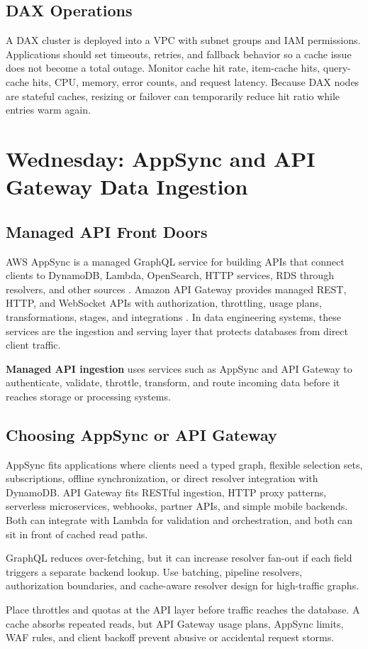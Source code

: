 \subsection{DAX Operations}
A DAX cluster is deployed into a VPC with subnet groups and IAM permissions. Applications should set timeouts, retries, and fallback behavior so a cache issue does not become a total outage. Monitor cache hit rate, item-cache hits, query-cache hits, CPU, memory, error counts, and request latency. Because DAX nodes are stateful caches, resizing or failover can temporarily reduce hit ratio while entries warm again.
\section{Wednesday: AppSync and API Gateway Data Ingestion}
\subsection{Managed API Front Doors}
AWS AppSync is a managed GraphQL service for building APIs that connect clients to DynamoDB, Lambda, OpenSearch, HTTP services, RDS through resolvers, and other sources \cite{awsAppSyncDeveloperGuide}. Amazon API Gateway provides managed REST, HTTP, and WebSocket APIs with authorization, throttling, usage plans, transformations, stages, and integrations \cite{awsAPIGatewayDeveloperGuide}. In data engineering systems, these services are the ingestion and serving layer that protects databases from direct client traffic.
\begin{definitionbox}
\textbf{Managed API ingestion} uses services such as AppSync and API Gateway to authenticate, validate, throttle, transform, and route incoming data before it reaches storage or processing systems.
\end{definitionbox}
\subsection{Choosing AppSync or API Gateway}
AppSync fits applications where clients need a typed graph, flexible selection sets, subscriptions, offline synchronization, or direct resolver integration with DynamoDB. API Gateway fits RESTful ingestion, HTTP proxy patterns, serverless microservices, webhooks, partner APIs, and simple mobile backends. Both can integrate with Lambda for validation and orchestration, and both can sit in front of cached read paths.
\begin{notebox}
GraphQL reduces over-fetching, but it can increase resolver fan-out if each field triggers a separate backend lookup. Use batching, pipeline resolvers, authorization boundaries, and cache-aware resolver design for high-traffic graphs.
\end{notebox}
\begin{tipbox}
Place throttles and quotas at the API layer before traffic reaches the database. A cache absorbs repeated reads, but API Gateway usage plans, AppSync limits, WAF rules, and client backoff prevent abusive or accidental request storms.
\end{tipbox}

